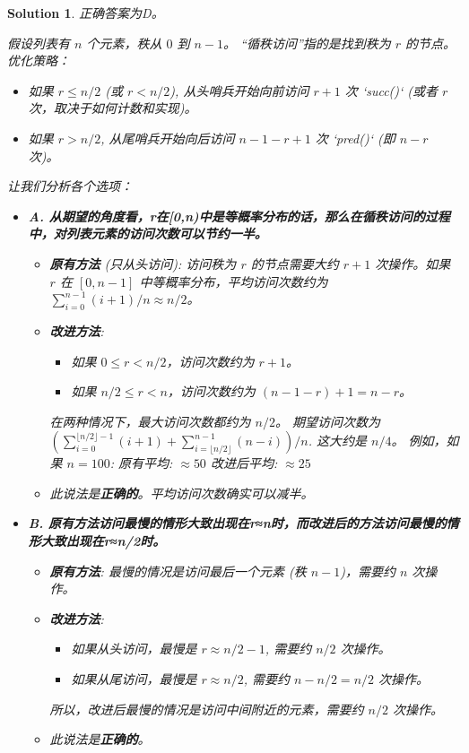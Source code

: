 \documentclass[UTF8]{report}
\newtheorem{solution}{Solution}
\theoremstyle{MyLineTheoremStyle} %
\theoremstyle{MyBlockTheoremStyle} %
\theoremstyle{MySubsubsectionStyle} %
\begin{document}
\begin{solution}
正确答案为D。

假设列表有 $n$ 个元素，秩从 $0$ 到 $n-1$。
“循秩访问”指的是找到秩为 $r$ 的节点。
优化策略：
\begin{itemize}
    \item 如果 $r \le n/2$ (或 $r < n/2$), 从头哨兵开始向前访问 $r+1$ 次 `succ()` (或者 $r$ 次，取决于如何计数和实现)。
    \item 如果 $r > n/2$, 从尾哨兵开始向后访问 $n-1-r+1$ 次 `pred()` (即 $n-r$ 次)。
\end{itemize}

让我们分析各个选项：

\begin{itemize}
    \item \textbf{A. 从期望的角度看，r在[0,n)中是等概率分布的话，那么在循秩访问的过程中，对列表元素的访问次数可以节约一半。}
    \begin{itemize}
        \item \textbf{原有方法} (只从头访问): 访问秩为 $r$ 的节点需要大约 $r+1$ 次操作。如果 $r$ 在 $[0, n-1]$ 中等概率分布，平均访问次数约为 $\sum_{i=0}^{n-1} (i+1)/n \approx n/2$。
        \item \textbf{改进方法}:
        \begin{itemize}
            \item 如果 $0 \le r < n/2$，访问次数约为 $r+1$。
            \item 如果 $n/2 \le r < n$，访问次数约为 $(n-1-r)+1 = n-r$。
        \end{itemize}
        在两种情况下，最大访问次数都约为 $n/2$。
        期望访问次数为 $\left( \sum_{i=0}^{\lfloor n/2 \rfloor -1} (i+1) + \sum_{i=\lfloor n/2 \rfloor}^{n-1} (n-i) \right) / n$.
        这大约是 $n/4$。
        例如，如果 $n=100$:
        原有平均: $\approx 50$
        改进后平均: $\approx 25$
        \item 此说法是\textbf{正确的}。平均访问次数确实可以减半。
    \end{itemize}

    \item \textbf{B. 原有方法访问最慢的情形大致出现在r≈n时，而改进后的方法访问最慢的情形大致出现在r≈n/2时。}
    \begin{itemize}
        \item \textbf{原有方法}: 最慢的情况是访问最后一个元素 (秩 $n-1$)，需要约 $n$ 次操作。
        \item \textbf{改进方法}:
        \begin{itemize}
            \item 如果从头访问，最慢是 $r \approx n/2 - 1$, 需要约 $n/2$ 次操作。
            \item 如果从尾访问，最慢是 $r \approx n/2$, 需要约 $n - n/2 = n/2$ 次操作。
        \end{itemize}
        所以，改进后最慢的情况是访问中间附近的元素，需要约 $n/2$ 次操作。
        \item 此说法是\textbf{正确的}。
    \end{itemize}


\end{itemize}
\end{solution}
\end{document}

